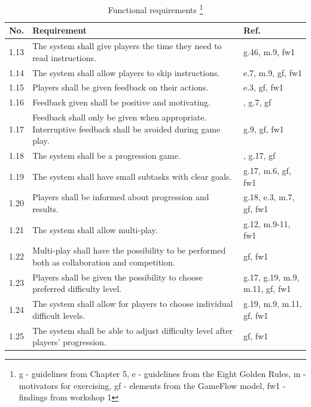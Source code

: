 \begin{minipage}{12 cm}
\begin{table} [H]
\centering
\begin{tabular}{|>{\raggedright}p{}|p{}|p{}|}
\hline
\textbf{No.} & \textbf{Requirement} & \textbf{Ref.} \\ \hline
1.13 & The system shall give players the time they need to read instructions. & g.46, m.9, fw1 \\ \hline 
1.14 & The system shall allow players to skip instructions. & e.7, m.9, gf, fw1 \\ \hline 
1.15 & Players shall be given feedback on their actions. &  e.3, gf, fw1 \\ \hline
1.16 & Feedback given shall be positive and motivating. & \cite{project}, g.7, gf \\ \hline
1.17 & Feedback shall only be given when appropriate. Interruptive feedback shall be avoided during game play. & g.9, gf, fw1 \\ \hline
1.18 & The system shall be a progression game. & \cite{understandingvg}, g.17, gf \\ \hline
1.19 & The system shall have small subtasks with clear goals. & g.17, m.6, gf, fw1\\ \hline
1.20 & Players shall be informed about progression and results. & g.18, e.3, m.7, gf, fw1 \\ \hline
1.21 & The system shall allow multi-play. & g.12, m.9-11, fw1 \\ \hline
1.22 & Multi-play shall have the possibility to be performed both as collaboration and competition. & gf, fw1\\ \hline
1.23 & Players shall be given the possibility to choose preferred difficulty level. & g.17, g.19, m.9, m.11, gf, fw1\\ \hline
1.24 & The system shall allow for players to choose individual difficult levels. & g.19, m.9, m.11, gf, fw1\\ \hline
1.25 & The system shall be able to adjust difficulty level after players' progression. & gf, fw1 \\ \hline
    \end{tabular}
    \caption[Functional requirements, part 2]{Functional requirements \footnote{g - guidelines from Chapter 5, e - guidelines from the Eight Golden Rules, m - motivators for exercising, gf - elements from the GameFlow model, fw1 - findings from workshop 1}}
    \label{tab:func2}
\end{table} 
\end{minipage}

